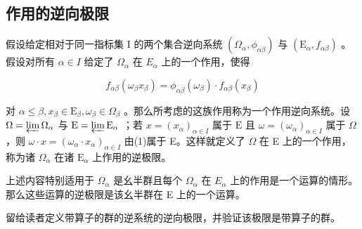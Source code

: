 \subsection{作用的逆向极限}

假设给定相对于同一指标集 I 的两个集合逆向系统 \((\Omega_{\alpha}, \phi_{\alpha\beta})\) 与 \((\mathrm{E}_{\alpha}, f_{\alpha\beta})\) 。假设对所有 \(\alpha \in I\) 给定了 \(\Omega_{\alpha}\) 在 \(E_{\alpha}\) 上的一个作用，使得

\[
f _ {\alpha \beta} (\omega_ {\beta} x _ {\beta}) = \phi_ {\alpha \beta} (\omega_ {\beta}) \cdot f _ {\alpha \beta} (x _ {\beta})\tag{1}
\]

对 \(\alpha \leqslant \beta, x_{\beta} \in \mathrm{E}_{\beta}, \omega_{\beta} \in \Omega_{\beta}\) 。那么所考虑的这族作用称为一个作用逆向系统。设 \(\Omega = \varprojlim \Omega_{\alpha}\) 与 \(\mathrm{E} = \varprojlim \mathrm{E}_{\alpha}\) ；若 \(x = (x_{\alpha})_{\alpha \in I}\) 属于 \(\mathrm{E}\) 且 \(\omega = (\omega_{\alpha})_{\alpha \in I}\) 属于 \(\Omega\) ，则 \(\omega \cdot x = (\omega_{\alpha} \cdot x_{\alpha})_{\alpha \in I}\) 由(1)属于 E。这样就定义了 \(\Omega\) 在 E 上的一个作用，称为诸 \(\Omega_{\alpha}\) 在诸 \(\mathrm{E}_{\alpha}\) 上作用的逆极限。

上述内容特别适用于 \(\Omega_{\alpha}\) 是幺半群且每个 \(\Omega_{\alpha}\) 在 \(E_{\alpha}\) 上的作用是一个运算的情形。那么这些运算的逆极限是该幺半群在 E 上的一个运算。

留给读者定义带算子的群的逆系统的逆向极限，并验证该极限是带算子的群。

